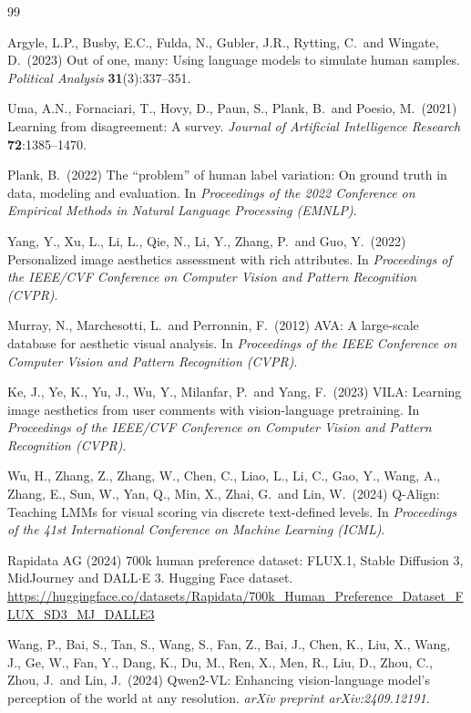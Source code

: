 \documentclass{article}
\begin{document}
\begingroup
\small
\begin{thebibliography}{99}

Argyle, L.P., Busby, E.C., Fulda, N., Gubler, J.R., Rytting, C.\ and Wingate, D.\ (2023)
Out of one, many: Using language models to simulate human samples.
{\it Political Analysis} {\bf 31}(3):337--351.

Uma, A.N., Fornaciari, T., Hovy, D., Paun, S., Plank, B.\ and Poesio, M.\ (2021)
Learning from disagreement: A survey.
{\it Journal of Artificial Intelligence Research} {\bf 72}:1385--1470.

Plank, B.\ (2022)
The ``problem'' of human label variation: On ground truth in data, modeling and evaluation.
In {\it Proceedings of the 2022 Conference on Empirical Methods in Natural Language Processing (EMNLP)}.

Yang, Y., Xu, L., Li, L., Qie, N., Li, Y., Zhang, P.\ and Guo, Y.\ (2022)
Personalized image aesthetics assessment with rich attributes.
In {\it Proceedings of the IEEE/CVF Conference on Computer Vision and Pattern Recognition (CVPR)}.

Murray, N., Marchesotti, L.\ and Perronnin, F.\ (2012)
AVA: A large-scale database for aesthetic visual analysis.
In {\it Proceedings of the IEEE Conference on Computer Vision and Pattern Recognition (CVPR)}.

Ke, J., Ye, K., Yu, J., Wu, Y., Milanfar, P.\ and Yang, F.\ (2023)
VILA: Learning image aesthetics from user comments with vision-language pretraining.
In {\it Proceedings of the IEEE/CVF Conference on Computer Vision and Pattern Recognition (CVPR)}.

Wu, H., Zhang, Z., Zhang, W., Chen, C., Liao, L., Li, C., Gao, Y., Wang, A., Zhang, E., Sun, W.,
Yan, Q., Min, X., Zhai, G.\ and Lin, W.\ (2024)
Q-Align: Teaching LMMs for visual scoring via discrete text-defined levels.
In {\it Proceedings of the 41st International Conference on Machine Learning (ICML)}.

Rapidata AG (2024)
700k human preference dataset: FLUX.1, Stable Diffusion 3, MidJourney and DALL$\cdot$E 3.
Hugging Face dataset.
\url{https://huggingface.co/datasets/Rapidata/700k_Human_Preference_Dataset_FLUX_SD3_MJ_DALLE3}

Wang, P., Bai, S., Tan, S., Wang, S., Fan, Z., Bai, J., Chen, K., Liu, X., Wang, J., Ge, W.,
Fan, Y., Dang, K., Du, M., Ren, X., Men, R., Liu, D., Zhou, C., Zhou, J.\ and Lin, J.\ (2024)
Qwen2-VL: Enhancing vision-language model's perception of the world at any resolution.
{\it arXiv preprint arXiv:2409.12191}.


\end{thebibliography}
\end{document}

